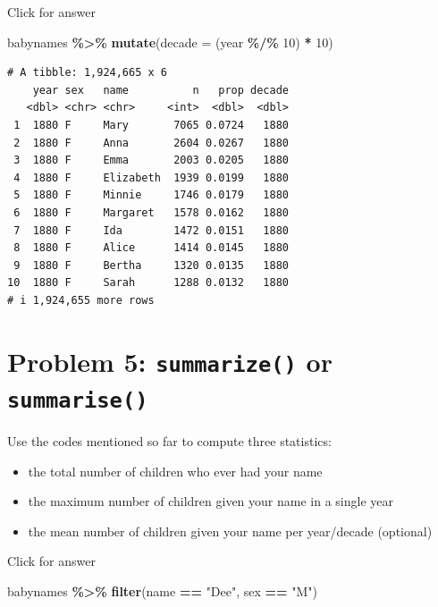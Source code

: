 \documentclass[
]{book}
\newenvironment{Shaded}{\begin{snugshade}}{\end{snugshade}}
\newcommand{\AttributeTok}[1]{\textcolor[rgb]{0.13,0.29,0.53}{#1}}
\newcommand{\DecValTok}[1]{\textcolor[rgb]{0.00,0.00,0.81}{#1}}
\newcommand{\FunctionTok}[1]{\textcolor[rgb]{0.13,0.29,0.53}{\textbf{#1}}}
\newcommand{\NormalTok}[1]{#1}
\newcommand{\SpecialCharTok}[1]{\textcolor[rgb]{0.81,0.36,0.00}{\textbf{#1}}}
\newcommand{\StringTok}[1]{\textcolor[rgb]{0.31,0.60,0.02}{#1}}
\providecommand{\tightlist}{%
  \setlength{\itemsep}{0pt}\setlength{\parskip}{0pt}}
\begin{document}
Click for answer

\begin{Shaded}
\begin{Highlighting}[]
\NormalTok{babynames }\SpecialCharTok{\%\textgreater{}\%} \FunctionTok{mutate}\NormalTok{(}\AttributeTok{decade =}\NormalTok{ (year }\SpecialCharTok{\%/\%} \DecValTok{10}\NormalTok{) }\SpecialCharTok{*} \DecValTok{10}\NormalTok{)}
\end{Highlighting}
\end{Shaded}

\begin{verbatim}
# A tibble: 1,924,665 x 6
    year sex   name          n   prop decade
   <dbl> <chr> <chr>     <int>  <dbl>  <dbl>
 1  1880 F     Mary       7065 0.0724   1880
 2  1880 F     Anna       2604 0.0267   1880
 3  1880 F     Emma       2003 0.0205   1880
 4  1880 F     Elizabeth  1939 0.0199   1880
 5  1880 F     Minnie     1746 0.0179   1880
 6  1880 F     Margaret   1578 0.0162   1880
 7  1880 F     Ida        1472 0.0151   1880
 8  1880 F     Alice      1414 0.0145   1880
 9  1880 F     Bertha     1320 0.0135   1880
10  1880 F     Sarah      1288 0.0132   1880
# i 1,924,655 more rows
\end{verbatim}

\hypertarget{problem-5-summarize-or-summarise}{%
\section{\texorpdfstring{Problem 5: \texttt{summarize()} or \texttt{summarise()}}{Problem 5: summarize() or summarise()}}\label{problem-5-summarize-or-summarise}}

Use the codes mentioned so far to compute three statistics:

\begin{itemize}
\tightlist
\item
  the total number of children who ever had your name
\item
  the maximum number of children given your name in a single year
\item
  the mean number of children given your name per year/decade (optional)
\end{itemize}

Click for answer

\begin{Shaded}
\begin{Highlighting}[]
\NormalTok{babynames }\SpecialCharTok{\%\textgreater{}\%} 
  \FunctionTok{filter}\NormalTok{(name }\SpecialCharTok{==} \StringTok{"Dee"}\NormalTok{, sex }\SpecialCharTok{==} \StringTok{"M"}\NormalTok{)}
\end{Highlighting}
\end{Shaded}
\end{document}

